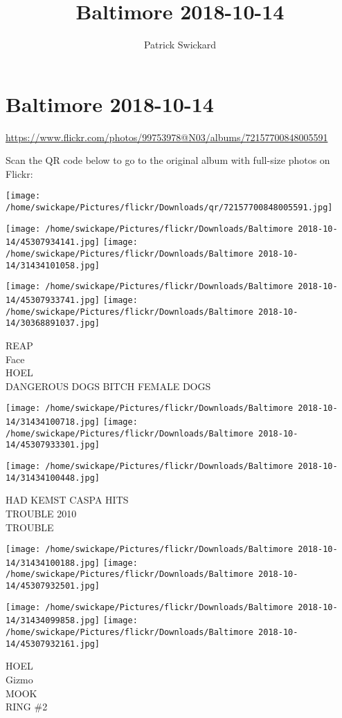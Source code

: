 \documentclass[10pt,letterpaper]{article}
\title{Baltimore 2018-10-14}
\author{Patrick Swickard}
\date{}
\begin{document}
\section*{Baltimore 2018-10-14}

\url{https://www.flickr.com/photos/99753978@N03/albums/72157700848005591}

Scan the QR code below to go to the original album with full-size photos on Flickr:

\texttt{[image: /home/swickape/Pictures/flickr/Downloads/qr/72157700848005591.jpg]}
\pagebreak

\texttt{[image: /home/swickape/Pictures/flickr/Downloads/Baltimore 2018-10-14/45307934141.jpg]}
\texttt{[image: /home/swickape/Pictures/flickr/Downloads/Baltimore 2018-10-14/31434101058.jpg]}

\texttt{[image: /home/swickape/Pictures/flickr/Downloads/Baltimore 2018-10-14/45307933741.jpg]}
\texttt{[image: /home/swickape/Pictures/flickr/Downloads/Baltimore 2018-10-14/30368891037.jpg]}

REAP\\
Face\\
HOEL\\
DANGEROUS DOGS BITCH FEMALE DOGS
\pagebreak

\texttt{[image: /home/swickape/Pictures/flickr/Downloads/Baltimore 2018-10-14/31434100718.jpg]}
\texttt{[image: /home/swickape/Pictures/flickr/Downloads/Baltimore 2018-10-14/45307933301.jpg]}

\vspace{0.25in}
\texttt{[image: /home/swickape/Pictures/flickr/Downloads/Baltimore 2018-10-14/31434100448.jpg]}

HAD KEMST CASPA HITS\\
TROUBLE 2010\\
TROUBLE
\pagebreak

\texttt{[image: /home/swickape/Pictures/flickr/Downloads/Baltimore 2018-10-14/31434100188.jpg]}
\texttt{[image: /home/swickape/Pictures/flickr/Downloads/Baltimore 2018-10-14/45307932501.jpg]}

\texttt{[image: /home/swickape/Pictures/flickr/Downloads/Baltimore 2018-10-14/31434099858.jpg]}
\texttt{[image: /home/swickape/Pictures/flickr/Downloads/Baltimore 2018-10-14/45307932161.jpg]}

HOEL\\
Gizmo\\
MOOK\\
RING \#2
\pagebreak
\end{document}
